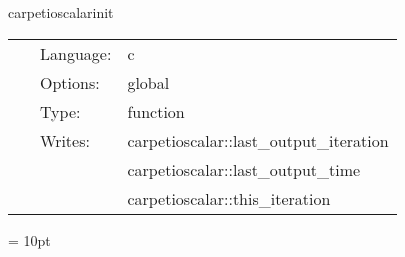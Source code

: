 \vspace{5mm}


\hspace{5mm} carpetioscalarinit 

\hspace{5mm}{\it initialisation routine } 


\hspace{5mm}

 \begin{tabular*}{160mm}{cll} 
~ & Language:  & c \\ 
~ & Options:  & global \\ 
~ & Type:  & function \\ 
~ & Writes:  & carpetioscalar::last\_output\_iteration \\ 
~& ~ &carpetioscalar::last\_output\_time\\ 
~& ~ &carpetioscalar::this\_iteration\\ 
\end{tabular*} 



\vspace{5mm}\parskip = 10pt 
